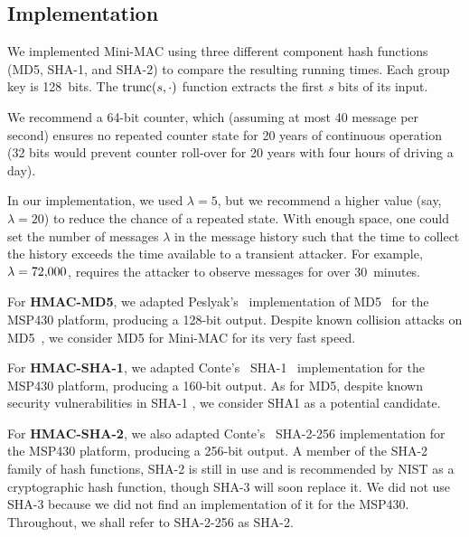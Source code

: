 \subsection{Implementation}
\label{implementation}

We implemented Mini-MAC using three different component hash functions (MD5, SHA-1, and SHA-2) to compare the resulting running times.  
Each group key is 128~bits.  The $\hbox{trunc}(s,\cdot)$ function extracts the first $s$ bits of its input.

We recommend a 64-bit counter, which (assuming at most 40 message per second) ensures no repeated counter state for 20 years
of continuous operation (32 bits would prevent counter roll-over for 20 years with four hours of driving a day).

In our implementation, we used $\lambda = 5$, 
but we recommend a higher value (say, $\lambda = 20$) to reduce the chance of a repeated state.
With enough space, one could set the number of messages $\lambda$ in the message history such that
the time to collect the history exceeds the time available to a transient attacker.
For example, $\lambda = \hbox{72,000}$, requires the attacker to observe messages
for over 30~minutes. 



For \textbf{HMAC-MD5},
we adapted Peslyak's~\cite{Peslyak} implementation of MD5~\cite{MD5} for the MSP430 platform, producing a 128-bit output. 
Despite known collision attacks on MD5~\cite{Wang-MD5}, we consider
MD5 for Mini-MAC for its very fast speed.  

For \textbf{HMAC-SHA-1},
we adapted Conte's~\cite{Conte-SHA1} SHA-1~\cite{FIPS-180-4} implementation for the MSP430 platform, producing a 160-bit output. 
As for MD5, despite known security vulnerabilities in SHA-1 \cite{Wang-SHA1}, 
we consider SHA1 as a potential candidate.

For \textbf{HMAC-SHA-2},
we also adapted Conte's~\cite{Conte-SHA256} SHA-2-256 implementation for the MSP430 platform, producing a 256-bit output. 
A member of the SHA-2 family of hash functions, SHA-2 is still in use and is recommended by NIST as a cryptographic hash function, 
though SHA-3 will soon replace it\cite{FIPS-180-4}. We did not use SHA-3 because we did not find an implementation of it
for the MSP430.  Throughout, we shall refer to SHA-2-256 as SHA-2.